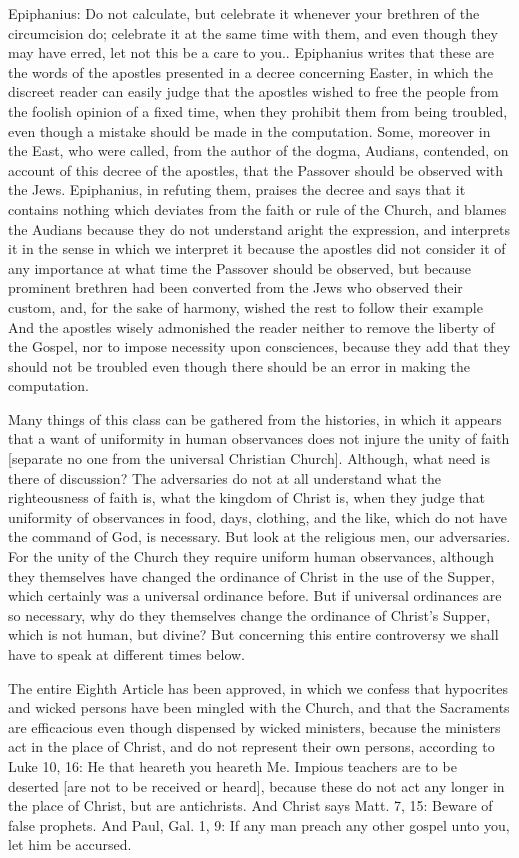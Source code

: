 Epiphanius: Do not calculate, but celebrate it whenever your brethren
of the circumcision do; celebrate it at the same time with them, and
even though they may have erred, let not this be a care to you..
Epiphanius writes that these are the words of the apostles presented
in a decree concerning Easter, in which the discreet reader can
easily judge that the apostles wished to free the people from the
foolish opinion of a fixed time, when they prohibit them from being
troubled, even though a mistake should be made in the computation.
Some, moreover in the East, who were called, from the author of the
dogma, Audians, contended, on account of this decree of the apostles,
that the Passover should be observed with the Jews.  Epiphanius, in
refuting them, praises the decree and says that it contains nothing
which deviates from the faith or rule of the Church, and blames the
Audians because they do not understand aright the expression, and
interprets it in the sense in which we interpret it because the
apostles did not consider it of any importance at what time the
Passover should be observed, but because prominent brethren had been
converted from the Jews who observed their custom, and, for the sake
of harmony, wished the rest to follow their example And the apostles
wisely admonished the reader neither to remove the liberty of the
Gospel, nor to impose necessity upon consciences, because they add
that they should not be troubled even though there should be an error
in making the computation.

Many things of this class can be gathered from the histories, in
which it appears that a want of uniformity in human observances does
not injure the unity of faith [separate no one from the universal
Christian Church].  Although, what need is there of discussion?  The
adversaries do not at all understand what the righteousness of faith
is, what the kingdom of Christ is, when they judge that uniformity of
observances in food, days, clothing, and the like, which do not have
the command of God, is necessary.  But look at the religious men, our
adversaries.  For the unity of the Church they require uniform human
observances, although they themselves have changed the ordinance of
Christ in the use of the Supper, which certainly was a universal
ordinance before.  But if universal ordinances are so necessary, why
do they themselves change the ordinance of Christ's Supper, which is
not human, but divine?  But concerning this entire controversy we
shall have to speak at different times below.

The entire Eighth Article has been approved, in which we confess that
hypocrites and wicked persons have been mingled with the Church, and
that the Sacraments are efficacious even though dispensed by wicked
ministers, because the ministers act in the place of Christ, and do
not represent their own persons, according to Luke 10, 16: He that
heareth you heareth Me.  Impious teachers are to be deserted [are not
to be received or heard], because these do not act any longer in the
place of Christ, but are antichrists.  And Christ says Matt. 7, 15:
Beware of false prophets.  And Paul, Gal. 1, 9: If any man preach any
other gospel unto you, let him be accursed.

